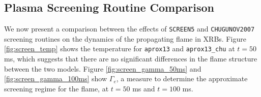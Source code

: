 \documentclass[preprint,times,tighten]{aastex631}
\begin{document}
\subsection{Plasma Screening Routine Comparison}\label{Sec:result_screening}









\begin{figure*}
\centering
{}
\caption{\label{fig:screen_temp} Slice plots comparing temperature for {\tt aprox13} (top panel) and {\tt aprox13\_chu} (bottom panel) at $t = 50$ ms.}
\end{figure*}


\begin{figure*}
\centering
{}
\caption{\label{fig:screen_gamma_50ms} Slice plots comparing $\Gamma_e$ for {\tt aprox13} (top panel) and {\tt aprox13\_chu} (bottom panel) at $t = 50$ ms.}
\end{figure*}


\begin{figure*}
\centering
{}
\caption{\label{fig:screen_gamma_100ms} Slice plots comparing $\Gamma_e$ for {\tt aprox13} (top panel) and {\tt aprox13\_chu} (bottom panel) at $t = 100$ ms.}
\end{figure*}

We now present a comparison between the effects of {\tt SCREEN5} and {\tt CHUGUNOV2007} screening routines on the dynamics of the propagating flame in XRBs. Figure \ref{fig:screen_temp} shows the temperature for {\tt aprox13} and {\tt aprox13\_chu} at $t = 50$ ms, which suggests that there are no significant differences in the flame structure between the two models. Figure \ref{fig:screen_gamma_50ms} and \ref{fig:screen_gamma_100ms} show $\Gamma_e$, a measure to determine the approximate screening regime for the flame, at $t = 50$ ms and $t = 100$ ms. 
\end{document}
